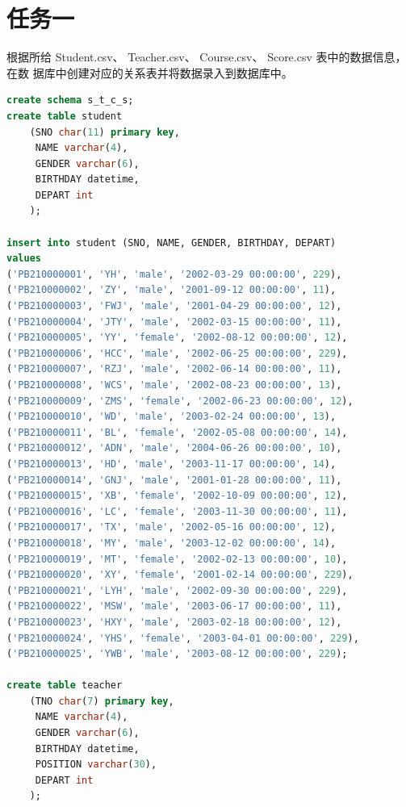 \documentclass{ctexart}
\begin{document}
\section{任务一}
根据所给 Student.csv、 Teacher.csv、 Course.csv、 Score.csv 表中的数据信息，在数
据库中创建对应的关系表并将数据录入到数据库中。
\begin{lstlisting}[language=sql]
	create schema s_t_c_s;  
create table student  
	(SNO char(11) primary key,  
     NAME varchar(4),  
     GENDER varchar(6),  
     BIRTHDAY datetime,  
     DEPART int  
	);  
  
insert into student (SNO, NAME, GENDER, BIRTHDAY, DEPART)  
values
('PB210000001', 'YH', 'male', '2002-03-29 00:00:00', 229),
('PB210000002', 'ZY', 'male', '2001-09-12 00:00:00', 11),
('PB210000003', 'FWJ', 'male', '2001-04-29 00:00:00', 12),
('PB210000004', 'JTY', 'male', '2002-03-15 00:00:00', 11),
('PB210000005', 'YY', 'female', '2002-08-12 00:00:00', 12),
('PB210000006', 'HCC', 'male', '2002-06-25 00:00:00', 229),
('PB210000007', 'RZJ', 'male', '2002-06-14 00:00:00', 11),
('PB210000008', 'WCS', 'male', '2002-08-23 00:00:00', 13),
('PB210000009', 'ZMS', 'female', '2002-06-23 00:00:00', 12),
('PB210000010', 'WD', 'male', '2003-02-24 00:00:00', 13),
('PB210000011', 'BL', 'female', '2002-05-08 00:00:00', 14),
('PB210000012', 'ADN', 'male', '2004-06-26 00:00:00', 10),
('PB210000013', 'HD', 'male', '2003-11-17 00:00:00', 14),
('PB210000014', 'GNJ', 'male', '2001-01-28 00:00:00', 11),
('PB210000015', 'XB', 'female', '2002-10-09 00:00:00', 12),
('PB210000016', 'LC', 'female', '2003-11-30 00:00:00', 11),
('PB210000017', 'TX', 'male', '2002-05-16 00:00:00', 12),
('PB210000018', 'MY', 'male', '2003-12-02 00:00:00', 14),
('PB210000019', 'MT', 'female', '2002-02-13 00:00:00', 10),
('PB210000020', 'XY', 'female', '2001-02-14 00:00:00', 229),
('PB210000021', 'LYH', 'male', '2002-09-30 00:00:00', 229),
('PB210000022', 'MSW', 'male', '2003-06-17 00:00:00', 11),
('PB210000023', 'HXY', 'male', '2003-02-18 00:00:00', 12),
('PB210000024', 'YHS', 'female', '2003-04-01 00:00:00', 229),
('PB210000025', 'YWB', 'male', '2003-08-12 00:00:00', 229);

create table teacher  
	(TNO char(7) primary key,  
	 NAME varchar(4),  
     GENDER varchar(6),  
     BIRTHDAY datetime,  
     POSITION varchar(30),  
     DEPART int  
	);  
  

\end{lstlisting}
\end{document}
